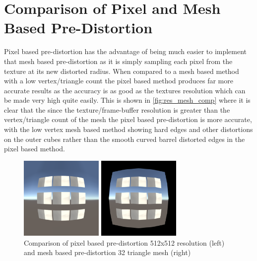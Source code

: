 \documentclass[]{article}
\begin{document}
\section{Comparison of Pixel and Mesh Based Pre-Distortion}
Pixel based pre-distortion has the advantage of being much easier to implement that mesh based pre-distortion as it is simply sampling each pixel from the texture at its new distorted radius. When compared to a mesh based method with a low vertex/triangle count the pixel based method produces far more accurate results as the accuracy is as good as the textures resolution which can be made very high quite easily. This is shown in \autoref{fig:res_mesh_comp} where it is clear that the since the texture/frame-buffer resolution is greater than the vertex/triangle count of the mesh the pixel based pre-distortion is more accurate, with the low vertex mesh based method showing hard edges and other distortions on the outer cubes rather than the smooth curved barrel distorted edges in the pixel based method.
\begin{figure}[H]
	\centering
	\begin{minipage}[H]{0.2\textwidth}
		\includegraphics[width=4cm]{Barrel_Frag_45}
	\end{minipage}
	\hspace{1cm}
	\begin{minipage}[H]{0.2\textwidth}
		\includegraphics[width=4cm]{Barrel_Vec_32}
	\end{minipage}
	\caption{Comparison of pixel based pre-distortion 512x512 resolution (left) and mesh based pre-distortion 32 triangle mesh (right)}
	\label{fig:res_mesh_comp}
\end{figure}
\end{document}
